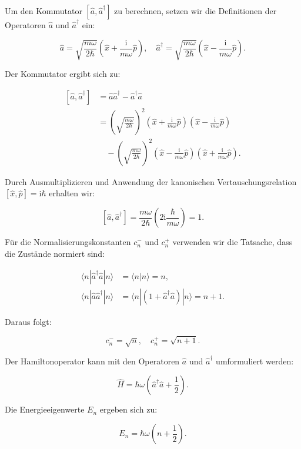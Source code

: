 Um den Kommutator $\left[\hat{a}, \hat{a}^{\dagger}\right]$ zu berechnen, setzen wir die Definitionen der Operatoren $\hat{a}$ und $\hat{a}^{\dagger}$ ein:

\[
\hat{a} = \sqrt{\frac{m \omega}{2 \hbar}}\left(\hat{x} + \frac{\mathrm{i}}{m \omega} \hat{p}\right), \quad \hat{a}^{\dagger} = \sqrt{\frac{m \omega}{2 \hbar}}\left(\hat{x} - \frac{\mathrm{i}}{m \omega} \hat{p}\right).
\]

Der Kommutator ergibt sich zu:

\[
\begin{align*}
\left[\hat{a}, \hat{a}^{\dagger}\right] &= \hat{a} \hat{a}^{\dagger} - \hat{a}^{\dagger} \hat{a} \\
&= \left(\sqrt{\frac{m \omega}{2 \hbar}}\right)^2 \left(\hat{x} + \frac{\mathrm{i}}{m \omega} \hat{p}\right)\left(\hat{x} - \frac{\mathrm{i}}{m \omega} \hat{p}\right) \\
&\quad - \left(\sqrt{\frac{m \omega}{2 \hbar}}\right)^2 \left(\hat{x} - \frac{\mathrm{i}}{m \omega} \hat{p}\right)\left(\hat{x} + \frac{\mathrm{i}}{m \omega} \hat{p}\right).
\end{align*}
\]

Durch Ausmultiplizieren und Anwendung der kanonischen Vertauschungsrelation $\left[\hat{x}, \hat{p}\right] = \mathrm{i} \hbar$ erhalten wir:

\[
\left[\hat{a}, \hat{a}^{\dagger}\right] = \frac{m \omega}{2 \hbar} \left(2 \mathrm{i} \frac{\hbar}{m \omega}\right) = 1.
\]

Für die Normalisierungskonstanten $c_n^{-}$ und $c_n^{+}$ verwenden wir die Tatsache, dass die Zustände normiert sind:

\[
\begin{align*}
\langle n | \hat{a}^{\dagger} \hat{a} | n \rangle &= \langle n | n \rangle = n, \\
\langle n | \hat{a} \hat{a}^{\dagger} | n \rangle &= \langle n | (1 + \hat{a}^{\dagger} \hat{a}) | n \rangle = n + 1.
\end{align*}
\]

Daraus folgt:

\[
c_n^{-} = \sqrt{n}, \quad c_n^{+} = \sqrt{n+1}.
\]

Der Hamiltonoperator kann mit den Operatoren $\hat{a}$ und $\hat{a}^{\dagger}$ umformuliert werden:

\[
\hat{H} = \hbar \omega \left(\hat{a}^{\dagger} \hat{a} + \frac{1}{2}\right).
\]

Die Energieeigenwerte $E_n$ ergeben sich zu:

\[
E_n = \hbar \omega \left(n + \frac{1}{2}\right).
\]